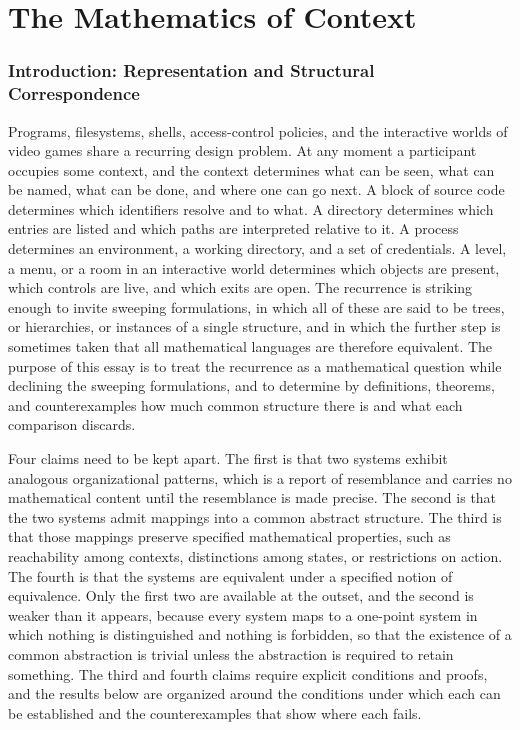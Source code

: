 \documentclass[11pt]{article}
\theoremstyle{definition}
\theoremstyle{remark}
\begin{document}
\tableofcontents
\bigskip

\part{The Mathematics of Context}

\section{Introduction: Representation and Structural Correspondence}

Programs, filesystems, shells, access-control policies, and the interactive worlds of video games share a recurring design problem. At any moment a participant occupies some context, and the context determines what can be seen, what can be named, what can be done, and where one can go next. A block of source code determines which identifiers resolve and to what. A directory determines which entries are listed and which paths are interpreted relative to it. A process determines an environment, a working directory, and a set of credentials. A level, a menu, or a room in an interactive world determines which objects are present, which controls are live, and which exits are open. The recurrence is striking enough to invite sweeping formulations, in which all of these are said to be trees, or hierarchies, or instances of a single structure, and in which the further step is sometimes taken that all mathematical languages are therefore equivalent. The purpose of this essay is to treat the recurrence as a mathematical question while declining the sweeping formulations, and to determine by definitions, theorems, and counterexamples how much common structure there is and what each comparison discards.

Four claims need to be kept apart. The first is that two systems exhibit analogous organizational patterns, which is a report of resemblance and carries no mathematical content until the resemblance is made precise. The second is that the two systems admit mappings into a common abstract structure. The third is that those mappings preserve specified mathematical properties, such as reachability among contexts, distinctions among states, or restrictions on action. The fourth is that the systems are equivalent under a specified notion of equivalence. Only the first two are available at the outset, and the second is weaker than it appears, because every system maps to a one-point system in which nothing is distinguished and nothing is forbidden, so that the existence of a common abstraction is trivial unless the abstraction is required to retain something. The third and fourth claims require explicit conditions and proofs, and the results below are organized around the conditions under which each can be established and the counterexamples that show where each fails.
\end{document}
